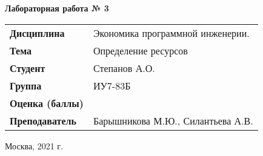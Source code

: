 \begin{center}
    \textbf{Лабораторная работа № 3} \\
    \vspace{0.5cm}
\end{center}

\vspace{4cm}

\begin{flushleft}
    \begin{tabular}{ll}
        \textbf{Дисциплина} & Экономика программной инженерии. \\
        \textbf{Тема} & Определение ресурсов \\
        \textbf{Студент} & Степанов А.О. \\
        \textbf{Группа} & ИУ7-83Б \\
        \textbf{Оценка (баллы)} & \\
        \textbf{Преподаватель} & Барышникова М.Ю., Силантьева А.В. \\
    \end{tabular}
\end{flushleft}

\vspace{4cm}

\begin{center}
    Москва, 2021 г.
\end{center}
